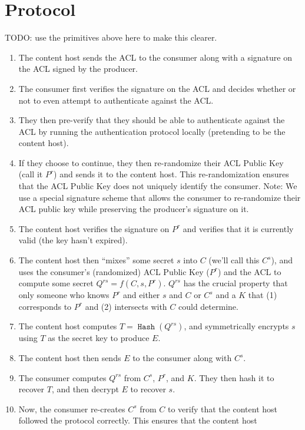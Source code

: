 \documentclass[pdftex,12pt,a4papaer,twoside,notitlepage]{report}
\DeclareMathOperator{\hash}{\mathtt{Hash}}
\begin{document}
\section{Protocol}

TODO: use the primitives above here to make this clearer.

\begin{enumerate}
  \item The content host sends the ACL to the consumer along with a signature on
    the ACL signed by the producer.
  \item The consumer first verifies the signature on the ACL and decides whether
    or not to even attempt to authenticate against the ACL.
  \item They then pre-verify that they should be able to authenticate against
    the ACL by running the authentication protocol locally (pretending to be the
    content host).
  \item If they choose to continue, they then re-randomize their ACL Public Key
    (call it $P^r$) and sends it to the content host. This re-randomization
    ensures that the ACL Public Key does not uniquely identify the consumer.
    Note: We use a special signature scheme that allows the consumer to
    re-randomize their ACL public key while preserving the producer's signature
    on it.
  \item The content host verifies the signature on $P^r$ and verifies that it is
    currently valid (the key hasn't expired).
  \item The content host then ``mixes'' some secret $s$ into $C$ (we'll call
    this $C^s$), and uses the consumer's (randomized) ACL Public Key ($P^r$) and
    the ACL to compute some secret $Q^{rs} = f(C, s, P^r)$. $Q^{rs}$ has the
    crucial property that only someone who knows $P^r$ and either $s$ and $C$ or
    $C^s$ and a $K$ that (1) corresponds to $P^r$ and (2) intersects with $C$
    could determine.
  \item The content host computes $T = \hash(Q^{rs})$, and symmetrically
    encrypts $s$ using $T$ as the secret key to produce $E$.
  \item The content host then sends $E$ to the consumer along with $C^s$.
  \item The consumer computes $Q^{rs}$ from $C^s$, $P^r$, and $K$. They then
    hash it to recover $T$, and then decrypt $E$ to recover $s$.
  \item Now, the consumer re-creates $C^s$ from $C$ to verify that the content
    host followed the protocol correctly. This ensures that the content host

\end{enumerate}
\end{document}
